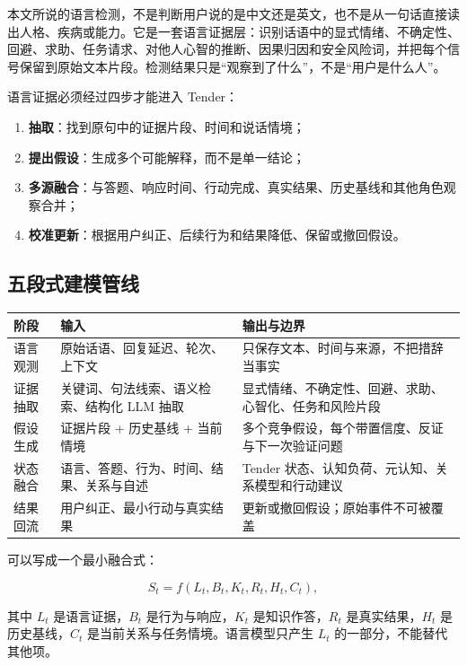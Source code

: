 \documentclass[UTF8,a4paper,11pt]{ctexart}
\begin{document}
本文所说的语言检测，不是判断用户说的是中文还是英文，也不是从一句话直接读出人格、疾病或能力。它是一套语言证据层：识别话语中的显式情绪、不确定性、回避、求助、任务请求、对他人心智的推断、因果归因和安全风险词，并把每个信号保留到原始文本片段。检测结果只是“观察到了什么”，不是“用户是什么人”。

语言证据必须经过四步才能进入 Tender：

\begin{enumerate}
\item \textbf{抽取}：找到原句中的证据片段、时间和说话情境；
\item \textbf{提出假设}：生成多个可能解释，而不是单一结论；
\item \textbf{多源融合}：与答题、响应时间、行动完成、真实结果、历史基线和其他角色观察合并；
\item \textbf{校准更新}：根据用户纠正、后续行为和结果降低、保留或撤回假设。
\end{enumerate}

\subsection{五段式建模管线}

\begin{center}
\begin{longtable}{@{}p{2.7cm}p{4.3cm}p{6.1cm}@{}}
\toprule
\textbf{阶段} & \textbf{输入} & \textbf{输出与边界} \\
\midrule
语言观测 & 原始话语、回复延迟、轮次、上下文 & 只保存文本、时间与来源，不把措辞当事实 \\
证据抽取 & 关键词、句法线索、语义检索、结构化 LLM 抽取 & 显式情绪、不确定性、回避、求助、心智化、任务和风险片段 \\
假设生成 & 证据片段 + 历史基线 + 当前情境 & 多个竞争假设，每个带置信度、反证与下一次验证问题 \\
状态融合 & 语言、答题、行为、时间、结果、关系与自述 & Tender 状态、认知负荷、元认知、关系模型和行动建议 \\
结果回流 & 用户纠正、最小行动与真实结果 & 更新或撤回假设；原始事件不可被覆盖 \\
\bottomrule
\end{longtable}
\end{center}

可以写成一个最小融合式：

\begin{equation}
S_t=f(L_t,B_t,K_t,R_t,H_t,C_t),
\end{equation}

其中 $L_t$ 是语言证据，$B_t$ 是行为与响应，$K_t$ 是知识作答，$R_t$ 是真实结果，$H_t$ 是历史基线，$C_t$ 是当前关系与任务情境。语言模型只产生 $L_t$ 的一部分，不能替代其他项。
\end{document}
